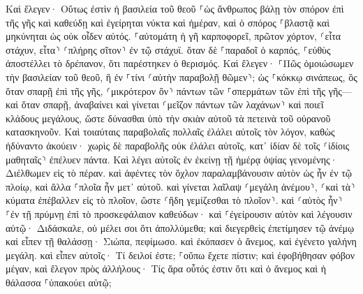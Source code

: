 \documentclass[twoside, 9pt]{extreport}
\begin{document}
Καὶ ἔλεγεν· Οὕτως ἐστὶν ἡ βασιλεία τοῦ θεοῦ ⸀ὡς ἄνθρωπος βάλῃ τὸν σπόρον ἐπὶ τῆς γῆς 
καὶ καθεύδῃ καὶ ἐγείρηται νύκτα καὶ ἡμέραν, καὶ ὁ σπόρος ⸀βλαστᾷ καὶ μηκύνηται ὡς οὐκ οἶδεν αὐτός. 
⸀αὐτομάτη ἡ γῆ καρποφορεῖ, πρῶτον χόρτον, ⸂εἶτα στάχυν, εἶτα⸃ ⸂πλήρης σῖτον⸃ ἐν τῷ στάχυϊ. 
ὅταν δὲ ⸀παραδοῖ ὁ καρπός, ⸀εὐθὺς ἀποστέλλει τὸ δρέπανον, ὅτι παρέστηκεν ὁ θερισμός. 
Καὶ ἔλεγεν· ⸀Πῶς ὁμοιώσωμεν τὴν βασιλείαν τοῦ θεοῦ, ἢ ἐν ⸀τίνι ⸂αὐτὴν παραβολῇ θῶμεν⸃; 
ὡς ⸀κόκκῳ σινάπεως, ὃς ὅταν σπαρῇ ἐπὶ τῆς γῆς, ⸂μικρότερον ὂν⸃ πάντων τῶν ⸀σπερμάτων τῶν ἐπὶ τῆς γῆς— 
καὶ ὅταν σπαρῇ, ἀναβαίνει καὶ γίνεται ⸂μεῖζον πάντων τῶν λαχάνων⸃ καὶ ποιεῖ κλάδους μεγάλους, ὥστε δύνασθαι ὑπὸ τὴν σκιὰν αὐτοῦ τὰ πετεινὰ τοῦ οὐρανοῦ κατασκηνοῦν. 
Καὶ τοιαύταις παραβολαῖς πολλαῖς ἐλάλει αὐτοῖς τὸν λόγον, καθὼς ἠδύναντο ἀκούειν· 
χωρὶς δὲ παραβολῆς οὐκ ἐλάλει αὐτοῖς, κατ᾽ ἰδίαν δὲ τοῖς ⸂ἰδίοις μαθηταῖς⸃ ἐπέλυεν πάντα. 
Καὶ λέγει αὐτοῖς ἐν ἐκείνῃ τῇ ἡμέρᾳ ὀψίας γενομένης· Διέλθωμεν εἰς τὸ πέραν. 
καὶ ἀφέντες τὸν ὄχλον παραλαμβάνουσιν αὐτὸν ὡς ἦν ἐν τῷ πλοίῳ, καὶ ἄλλα ⸀πλοῖα ἦν μετ᾽ αὐτοῦ. 
καὶ γίνεται λαῖλαψ ⸂μεγάλη ἀνέμου⸃, ⸂καὶ τὰ⸃ κύματα ἐπέβαλλεν εἰς τὸ πλοῖον, ὥστε ⸂ἤδη γεμίζεσθαι τὸ πλοῖον⸃. 
καὶ ⸂αὐτὸς ἦν⸃ ⸀ἐν τῇ πρύμνῃ ἐπὶ τὸ προσκεφάλαιον καθεύδων· καὶ ⸀ἐγείρουσιν αὐτὸν καὶ λέγουσιν αὐτῷ· Διδάσκαλε, οὐ μέλει σοι ὅτι ἀπολλύμεθα; 
καὶ διεγερθεὶς ἐπετίμησεν τῷ ἀνέμῳ καὶ εἶπεν τῇ θαλάσσῃ· Σιώπα, πεφίμωσο. καὶ ἐκόπασεν ὁ ἄνεμος, καὶ ἐγένετο γαλήνη μεγάλη. 
καὶ εἶπεν αὐτοῖς· Τί δειλοί ἐστε; ⸀οὔπω ἔχετε πίστιν; 
καὶ ἐφοβήθησαν φόβον μέγαν, καὶ ἔλεγον πρὸς ἀλλήλους· Τίς ἄρα οὗτός ἐστιν ὅτι καὶ ὁ ἄνεμος καὶ ἡ θάλασσα ⸀ὑπακούει αὐτῷ; 
\end{document}
